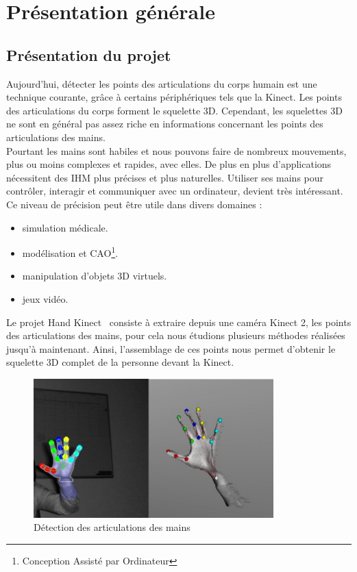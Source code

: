 \chapter{Présentation générale}

\section{Présentation du projet}
Aujourd'hui, détecter les points des articulations du corps humain 
est une technique courante, grâce à certains périphériques tels que la 
Kinect. Les points des articulations du corps forment le squelette 3D. 
Cependant, les squelettes 3D ne sont en général pas assez riche en 
informations concernant les points des articulations des mains.\\

Pourtant les mains sont habiles et nous pouvons faire de nombreux 
mouvements, plus ou moins complexes et rapides, avec elles. De plus en 
plus d'applications nécessitent des IHM plus précises et plus 
naturelles. Utiliser ses mains pour contrôler, interagir et communiquer 
avec un ordinateur, devient très intéressant. Ce niveau de 
précision peut être utile dans divers domaines :
\begin{itemize}
  \item simulation médicale.
  \item modélisation et CAO\footnote{Conception Assisté par Ordinateur}.
  \item manipulation d'objets 3D virtuels.
  \item jeux vidéo.\\
\end{itemize}

Le projet \og Hand Kinect \fg \ consiste à extraire depuis une caméra Kinect 2, 
les points des articulations des mains, pour cela nous étudions plusieurs 
méthodes réalisées jusqu'à maintenant. Ainsi, l'assemblage de ces points 
nous permet d'obtenir le squelette 3D complet de la personne devant la 
Kinect.\\

\begin{figure}[H]
  \label{jointPoint}
  \begin{center}
    \includegraphics[width=350px]{images/joint_detection.png}
    \caption{Détection des articulations des mains}
  \end{center}
\end{figure}

